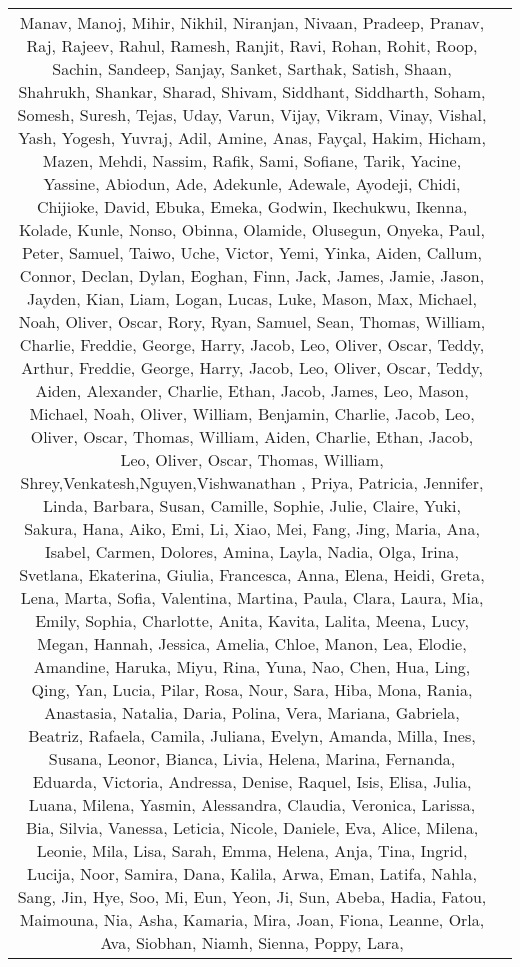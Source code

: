 \begin{table*}[ht!]
{\begin{tabular}{|c|p{17.5cm}|}
    Manav, Manoj, Mihir, Nikhil, Niranjan, Nivaan, Pradeep, Pranav, Raj, Rajeev,
    Rahul, Ramesh, Ranjit, Ravi, Rohan, Rohit, Roop, Sachin, Sandeep, Sanjay,
    Sanket, Sarthak, Satish, Shaan, Shahrukh, Shankar, Sharad, Shivam, Siddhant, Siddharth,
    Soham, Somesh, Suresh, Tejas, Uday, Varun, Vijay, Vikram, Vinay, Vishal,
    Yash, Yogesh, Yuvraj, Adil, Amine, Anas, Fayçal, Hakim,
    Hicham, Mazen, Mehdi, Nassim, Rafik, Sami, Sofiane, Tarik, Yacine, Yassine,
    Abiodun, Ade, Adekunle, Adewale, Ayodeji, Chidi, Chijioke, David, Ebuka, Emeka,
    Godwin, Ikechukwu, Ikenna, Kolade, Kunle, Nonso, Obinna, Olamide, Olusegun, Onyeka,
    Paul, Peter, Samuel, Taiwo, Uche, Victor, Yemi, Yinka, Aiden, Callum,
    Connor, Declan, Dylan, Eoghan, Finn, Jack, James, Jamie,
    Jason, Jayden, Kian, Liam, Logan, Lucas, Luke, Mason, Max, Michael,
    Noah, Oliver, Oscar, Rory, Ryan, Samuel, Sean, Thomas, William, Charlie,
    Freddie, George, Harry, Jacob, Leo, Oliver, Oscar, Teddy, Arthur, Freddie,
    George, Harry, Jacob, Leo, Oliver, Oscar, Teddy, Aiden, Alexander, Charlie,
    Ethan, Jacob, James, Leo, Mason, Michael, Noah, Oliver, William, Benjamin,
    Charlie, Jacob, Leo, Oliver, Oscar, Thomas, William, Aiden, Charlie, Ethan,
    Jacob, Leo, Oliver, Oscar, Thomas, William, Shrey,Venkatesh,Nguyen,Vishwanathan ,    Priya, Patricia, Jennifer, Linda, Barbara, Susan, Camille, Sophie, Julie, Claire, Yuki, Sakura, Hana, Aiko,  Emi, Li, Xiao, Mei, Fang, Jing, Maria, Ana, Isabel, Carmen,
    Dolores, Amina, Layla, Nadia, Olga, Irina, Svetlana,
    Ekaterina, Giulia, Francesca, Anna, Elena, Heidi, Greta, Lena, Marta, Sofia,
    Valentina, Martina, Paula, Clara, Laura, Mia, Emily, Sophia, Charlotte,
    Anita, Kavita, Lalita, Meena, Lucy, Megan, Hannah, Jessica, Amelia,
    Chloe, Manon, Lea, Elodie, Amandine, Haruka, Miyu, Rina, Yuna, Nao,
    Chen, Hua, Ling, Qing, Yan, Lucia, Pilar, Rosa, Nour, Sara,
    Hiba, Mona, Rania, Anastasia, Natalia, Daria, Polina, Vera, Mariana, Gabriela,
    Beatriz, Rafaela, Camila, Juliana, Evelyn, Amanda, Milla, Ines, Susana,
    Leonor, Bianca, Livia, Helena, Marina, Fernanda, Eduarda, Victoria, Andressa, Denise,
    Raquel, Isis, Elisa, Julia, Luana, Milena, Yasmin, Alessandra, Claudia, Veronica,
    Larissa, Bia, Silvia, Vanessa, Leticia, Nicole, Daniele, Eva, Alice, Milena,
    Leonie, Mila, Lisa, Sarah, Emma, Helena, Anja,
     Tina, Ingrid, Lucija,    Noor, Samira, Dana, Kalila, Arwa, Eman, Latifa, Nahla, Sang,
    Jin, Hye, Soo, Mi, Eun, Yeon, Ji, Sun, Abeba,
    Hadia, Fatou, Maimouna, Nia, Asha, Kamaria, Mira, Joan,
    Fiona, Leanne, Orla, Ava, Siobhan, Niamh, Sienna, Poppy, Lara,

\end{tabular}}
\end{table*}
